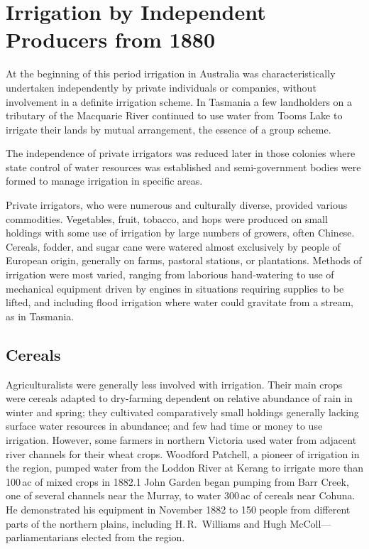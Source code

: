 
\setcounter{endnote}{0}
 
\chapter{Irrigation by Independent Producers from 1880}
\label{ch:indep}

At the beginning of this period irrigation in Australia was
characteristically undertaken independently by private individuals or
companies, without involvement in a definite irrigation scheme.  In
Tasmania a few landholders on a tributary of the Macquarie River
continued to use water from Tooms Lake to irrigate their lands by
mutual arrangement, the essence of a group scheme.

The independence of private irrigators was reduced later in those
colonies where state control of water resources was established and
semi-government bodies were formed to manage irrigation in specific
areas.

Private irrigators, who were numerous and culturally diverse, provided
various commodities.  Vegetables, fruit, tobacco, and hops were
produced on small holdings with some use of irrigation by large
numbers of growers, often Chinese.  Cereals, fodder, and sugar cane
were watered almost exclusively by people of European origin,
generally on farms, pastoral stations, or plantations.  Methods of
irrigation were most varied, ranging from laborious hand-watering to
use of mechanical equipment driven by engines in situations requiring
supplies to be lifted, and including flood irrigation where water
could gravitate from a stream, as in Tasmania.

\section*{Cereals}

Agriculturalists were generally less involved with irrigation. Their
main crops were cereals adapted to dry-farming dependent on relative
abundance of rain in winter and spring; they cultivated comparatively
small holdings generally lacking surface water resources in abundance;
and few had time or money to use irrigation.  However, some farmers in
northern Victoria used water from adjacent river channels for their
wheat crops.  Woodford Patchell, a pioneer of irrigation in the
region, pumped water from the Loddon River at Kerang to irrigate more
than 100\,ac of mixed crops in 1882.1  John Garden began pumping from Barr Creek, one of
several channels near the Murray, to water 300\,ac of cereals near
Cohuna.  He demonstrated his equipment in November 1882 to 150 people
from different parts of the northern plains, including H.\,R.~Williams
and Hugh McColl---parliamentarians elected from the
region.

